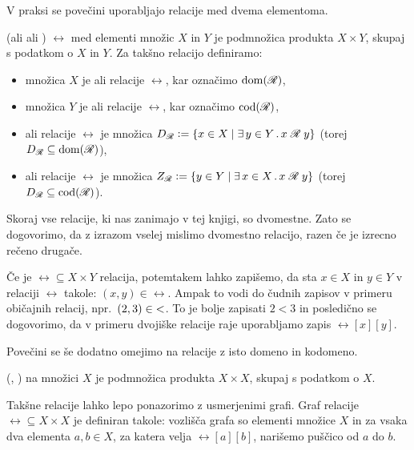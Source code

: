 		V praksi se povečini uporabljajo relacije med dvema elementoma.
		\begin{definicija}
			 (ali  ali )  $\rel$ med elementi množic $X$ in $Y$ je podmnožica produkta $X \times Y$, skupaj s podatkom o $X$ in $Y$. Za takšno relacijo definiramo:
			\begin{itemize}
				\item
					množica $X$ je  ali  relacije $\rel$, kar označimo $\dom(\rel)$,
				\item
					množica $Y$ je  ali  relacije $\rel$, kar označimo $\cod(\rel)$,
				\item
					 ali  relacije $\rel$ je množica $\dd{\rel} \dfeq \set{x \in X}{\xsome{y}[Y]{\rel[x][y]}}$ (torej $\dd{\rel} \subseteq \dom(\rel)$),
				\item
					 ali  relacije $\rel$ je množica $\rn{\rel} \dfeq \set{y \in Y}{\xsome{x}[X]{\rel[x][y]}}$ (torej $\dd{\rel} \subseteq \cod(\rel)$). 
			\end{itemize}
		\end{definicija}
		
		Skoraj vse relacije, ki nas zanimajo v tej knjigi, so dvomestne. Zato se dogovorimo, da z izrazom  vselej mislimo dvomestno relacijo, razen če je izrecno rečeno drugače.
		
		Če je $\rel \subseteq X \times Y$ relacija, potemtakem lahko zapišemo, da sta $x \in X$ in $y \in Y$ v relaciji $\rel$ takole: $(x, y) \in \rel$. Ampak to vodi do čudnih zapisov v primeru običajnih relacij, npr.~$(2, 3) \in \mathnormal{<}$. To je bolje zapisati $2 < 3$ in posledično se dogovorimo, da v primeru dvojiške relacije raje uporabljamo zapis $\rel[x][y]$.
		
		Povečini se še dodatno omejimo na relacije z isto domeno in kodomeno.
		\begin{definicija}
			 (, )  na množici $X$ je podmnožica produkta $X \times X$, skupaj s podatkom o $X$.
		\end{definicija}
		
		Takšne relacije lahko lepo ponazorimo z usmerjenimi grafi. Graf relacije $\rel \subseteq X \times X$ je definiran takole: vozlišča grafa so elementi množice $X$ in za vsaka dva elementa $a, b \in X$, za katera velja $\rel[a][b]$, narišemo puščico od $a$ do $b$.
		

